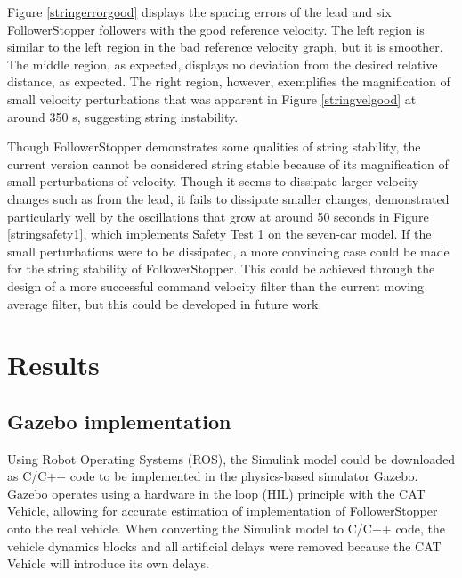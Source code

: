 \documentclass[conference]{IEEEtran}
\begin{document}
Figure \ref{stringerrorgood} displays the spacing errors of the lead and six FollowerStopper followers with the good reference velocity. The left region is similar to the left region in the bad reference velocity graph, but it is smoother. The middle region, as expected, displays no deviation from the desired relative distance, as expected. The right region, however, exemplifies the magnification of small velocity perturbations that was apparent in Figure \ref{stringvelgood} at around 350 s, suggesting string instability.

Though FollowerStopper demonstrates some qualities of string stability, the current version cannot be considered string stable because of its magnification of small perturbations of velocity. Though it seems to dissipate larger velocity changes such as from the lead, it fails to dissipate smaller changes, demonstrated particularly well by the oscillations that grow at around 50 seconds in Figure \ref{stringsafety1}, which implements Safety Test 1 on the seven-car model. If the small perturbations were to be dissipated, a more convincing case could be made for the string stability of FollowerStopper. This could be achieved through the design of a more successful command velocity filter than the current moving average filter, but this could be developed in future work.






\section{Results}

\subsection{Gazebo implementation}
Using Robot Operating Systems (ROS), the Simulink model could be downloaded as C/C++ code to be implemented in the physics-based simulator Gazebo. Gazebo operates using a hardware in the loop (HIL) principle with the CAT Vehicle, allowing for accurate estimation of implementation of FollowerStopper onto the real vehicle. When converting the Simulink model to C/C++ code, the vehicle dynamics blocks and all artificial delays were removed because the CAT Vehicle will introduce its own delays.
\end{document}
